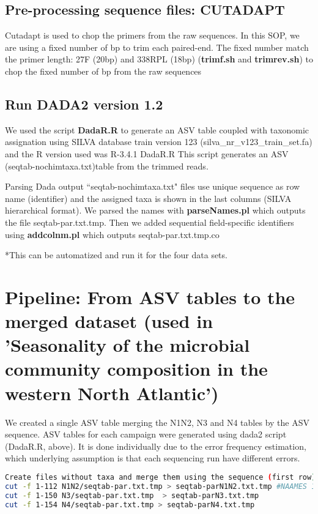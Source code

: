 \documentclass{article}
\begin{document}
\subsection{Pre-processing sequence files: CUTADAPT}
Cutadapt is used to chop the primers from the raw sequences. In this SOP, we are using a fixed number of bp to trim each paired-end. The fixed number match the primer length: 27F (20bp) and 338RPL (18bp) (\textbf{trimf.sh} and \textbf{trimrev.sh}) to chop the fixed number of bp from the raw sequences

\subsection{Run DADA2 version 1.2}
We used the script \textbf{DadaR.R} to generate an ASV table coupled with taxonomic assignation using SILVA database train version 123 (silva\_nr\_v123\_train\_set.fa) and the R version used was R-3.4.1 DadaR.R This script generates an ASV (seqtab-nochimtaxa.txt)table from the trimmed reads.


\begin{subsection}{Parsing Dada output}
“seqtab-nochimtaxa.txt" files use unique sequence as row name (identifier) and the assigned taxa is shown in the last columns (SILVA hierarchical format). We parsed the names with  \textbf{parseNames.pl} which outputs the file seqtab-par.txt.tmp. Then we added sequential field-specific identifiers using \textbf{addcolnm.pl} which outputs seqtab-par.txt.tmp.co

\end{subsection}

*This can be automatized and run it for the four data sets. 

\section{Pipeline: From ASV tables to the merged dataset (used in 'Seasonality of the microbial community composition in the western North Atlantic')}
We created a single ASV table merging the N1N2, N3 and N4 tables by the ASV sequence. ASV tables for each campaign were generated using dada2 script (DadaR.R, above). It is done individually due to the error frequency estimation, which underlying assumption is that each sequencing run have different errors. 
\begin{lstlisting}[language=bash,caption={parsing the files for merging}]
Create files without taxa and merge them using the sequence (first row)
cut -f 1-112 N1N2/seqtab-par.txt.tmp > seqtab-parN1N2.txt.tmp #NAAMES 1 and NAAMES 2 were analyzed together in the previous paper and we are keeping it consistent. 
cut -f 1-150 N3/seqtab-par.txt.tmp  > seqtab-parN3.txt.tmp
cut -f 1-154 N4/seqtab-par.txt.tmp > seqtab-parN4.txt.tmp
\end{lstlisting}
\end{document}
